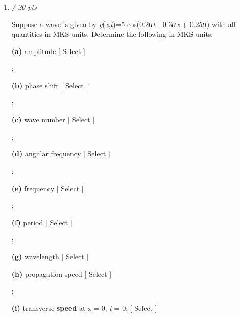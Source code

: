 \documentclass[11pt]{article}
\begin{document}
\begin{enumerate}[leftmargin=*,label=\textbf{Question \arabic*.}]
 \emph{L} = \rule{2cm}{0.4pt} m

\textit{Correct answer: } 0.752

\item \hfill \textit{/ 20 pts}

Suppose a wave is given by \emph{y}(\emph{x},\emph{t})=5 cos(0.2𝜋\emph{t - }0.3𝜋\emph{x} + 0.25𝜋) with all quantities in MKS units. Determine the following in MKS units:

\textbf{(a)} amplitude
 [ Select ]

;

\textbf{(b)} phase shift
 [ Select ]

;

\textbf{(c)} wave number
 [ Select ]

;

\textbf{(d)} angular frequency
 [ Select ]

;

\textbf{(e)} frequency
 [ Select ]

;

\textbf{(f)} period
 [ Select ]

;

\textbf{(g)} wavelength
 [ Select ]


\textbf{(h)} propagation speed
 [ Select ]

;

\textbf{(i) }transverse \textbf{speed} at \emph{x} = 0, \emph{t} = 0:
 [ Select ]


\end{enumerate}
\end{document}
